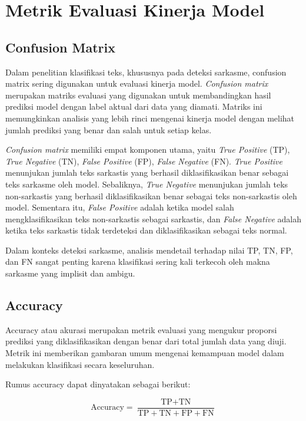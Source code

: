 \section{Metrik Evaluasi Kinerja Model}
\subsection{Confusion Matrix}

Dalam penelitian klasifikasi teks, khususnya pada deteksi sarkasme, confusion matrix sering digunakan untuk evaluasi kinerja model. \textit{Confusion matrix} merupakan matriks evaluasi yang digunakan untuk membandingkan hasil prediksi model dengan label aktual dari data yang diamati. Matriks ini memungkinkan analisis yang lebih rinci mengenai kinerja model dengan melihat jumlah prediksi yang benar dan salah untuk setiap kelas.

\textit{Confusion matrix} memiliki empat komponen utama, yaitu \textit{True Positive} (TP), \textit{True Negative} (TN), \textit{False Positive} (FP), \textit{False Negative} (FN). \textit{True Positive} menunjukan jumlah teks sarkastis yang berhasil diklasifikasikan benar sebagai teks sarkasme oleh model. Sebaliknya, \textit{True Negative} menunjukan jumlah teks non-sarkastis yang berhasil diklasifikasikan benar sebagai teks non-sarkastis oleh model. Sementara itu, \textit{False Positive} adalah ketika model salah mengklasifikasikan teks non-sarkastis sebagai sarkastis, dan \textit{False Negative} adalah ketika teks sarkastis tidak terdeteksi dan diklasifikasikan sebagai teks normal.

Dalam konteks deteksi sarkasme, analisis mendetail terhadap nilai TP, TN, FP, dan FN sangat penting karena klasifikasi sering kali terkecoh oleh makna sarkasme yang implisit dan ambigu.

\subsection{Accuracy}
Accuracy atau akurasi merupakan metrik evaluasi yang mengukur proporsi prediksi yang diklasifikasikan dengan benar dari total jumlah data yang diuji. Metrik ini memberikan gambaran umum mengenai kemampuan model dalam melakukan klasifikasi secara keseluruhan.

Rumus accuracy dapat dinyatakan sebagai berikut:

\begin{equation}
\text{Accuracy} = \frac{\text{TP} + \text{TN}}{\text{TP} + \text{TN} + \text{FP} + \text{FN}}
\end{equation}

